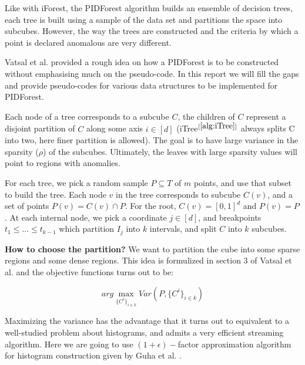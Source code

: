 Like with iForest, the PIDForest algorithm builds an ensemble of decision trees, each tree is built using a sample of the data set and partitions the space into subcubes. 
However, the way the trees are constructed and the criteria by which a point is declared anomalous are very different.

Vatsal et al. \cite{NIPS2019_9710} provided a rough idea on how a PIDForest is to be constructed without emphasising much on the pseudo-code. In this report we will fill the gaps and provide pseudo-codes for various data structures to be implemented for PIDForest.

Each node of a tree corresponds to a subcube $C$, the children of $C$ represent a disjoint partition of $C$ along some axis $i \in [d]$ (iTree$^{[\ref{alg:iTree}]}$ always splits C into two, here finer partition is allowed). 
The goal is to have large variance in the sparsity ($\rho$) of the subcubes. 
Ultimately, the leaves with large sparsity values will point to regions with anomalies.

For each tree, we pick a random sample $P \subseteq T$ of $m$ points, and use that subset to build the tree.
Each node $v$ in the tree corresponds to subcube $C(v)$, and a set of points $P(v) = C(v) \cap P$.
For the root, $C(v) = [0, 1]^d$ and $P (v) = P$. 
At each internal node, we pick a coordinate $j \in [d]$, and breakpoints $t_{1} \leq ... \leq t_{k-1}$ which partition $I_j$ into $k$ intervals, and split $C$ into $k$ subcubes. 

\textbf{How to choose the partition?} We want to partition the cube into some sparse regions and some dense regions. 
This idea is formulized in section 3 of Vatsal et al. \cite{NIPS2019_9710} and the objective functions turns out to be:

\vspace{-2em}
\begin{equation}
    \label{eq:maximizing-variance}
        arg \max_{ \{ C^i \}_{i \in k} } Var(P, \{ C^i \}_{i \in k})
\end{equation}

Maximizing the variance has the advantage that it turns out to equivalent to a well-studied problem about histograms, and admits a very efficient streaming algorithm. Here we are going to use $(1+ \epsilon)-$factor approximation algorithm for histogram construction given by Guha et al. \cite{10.1145/1132863.1132873}.



